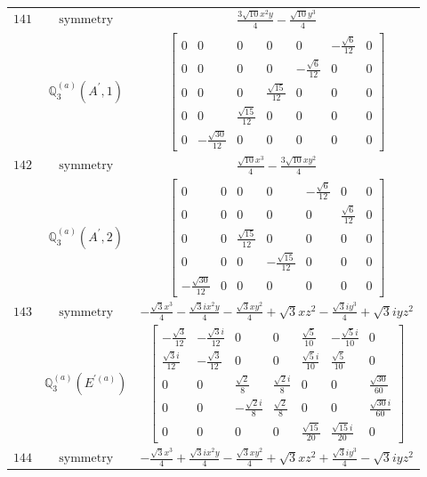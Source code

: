 \documentclass[fleqn,8pt,landscape]{jsarticle}
\begin{document}
\begin{longtable}{ccc}
$ 141 $ & $ \text{symmetry} $ & $ \frac{3 \sqrt{10} x^{2} y}{4} - \frac{\sqrt{10} y^{3}}{4} $ \\
$  $ & $ \mathbb{Q}_{3}^{(a)}(A^{\prime},1) $ & $ \begin{bmatrix} 0 & 0 & 0 & 0 & 0 & - \frac{\sqrt{6}}{12} & 0 \\ 0 & 0 & 0 & 0 & - \frac{\sqrt{6}}{12} & 0 & 0 \\ 0 & 0 & 0 & \frac{\sqrt{15}}{12} & 0 & 0 & 0 \\ 0 & 0 & \frac{\sqrt{15}}{12} & 0 & 0 & 0 & 0 \\ 0 & - \frac{\sqrt{30}}{12} & 0 & 0 & 0 & 0 & 0 \end{bmatrix} $ \\ \hline
$ 142 $ & $ \text{symmetry} $ & $ \frac{\sqrt{10} x^{3}}{4} - \frac{3 \sqrt{10} x y^{2}}{4} $ \\
$  $ & $ \mathbb{Q}_{3}^{(a)}(A^{\prime},2) $ & $ \begin{bmatrix} 0 & 0 & 0 & 0 & - \frac{\sqrt{6}}{12} & 0 & 0 \\ 0 & 0 & 0 & 0 & 0 & \frac{\sqrt{6}}{12} & 0 \\ 0 & 0 & \frac{\sqrt{15}}{12} & 0 & 0 & 0 & 0 \\ 0 & 0 & 0 & - \frac{\sqrt{15}}{12} & 0 & 0 & 0 \\ - \frac{\sqrt{30}}{12} & 0 & 0 & 0 & 0 & 0 & 0 \end{bmatrix} $ \\ \hline
$ 143 $ & $ \text{symmetry} $ & $ - \frac{\sqrt{3} x^{3}}{4} - \frac{\sqrt{3} i x^{2} y}{4} - \frac{\sqrt{3} x y^{2}}{4} + \sqrt{3} x z^{2} - \frac{\sqrt{3} i y^{3}}{4} + \sqrt{3} i y z^{2} $ \\
$  $ & $ \mathbb{Q}_{3}^{(a)}(E^{\prime(a)}) $ & $ \begin{bmatrix} - \frac{\sqrt{3}}{12} & - \frac{\sqrt{3} i}{12} & 0 & 0 & \frac{\sqrt{5}}{10} & - \frac{\sqrt{5} i}{10} & 0 \\ \frac{\sqrt{3} i}{12} & - \frac{\sqrt{3}}{12} & 0 & 0 & \frac{\sqrt{5} i}{10} & \frac{\sqrt{5}}{10} & 0 \\ 0 & 0 & \frac{\sqrt{2}}{8} & \frac{\sqrt{2} i}{8} & 0 & 0 & \frac{\sqrt{30}}{60} \\ 0 & 0 & - \frac{\sqrt{2} i}{8} & \frac{\sqrt{2}}{8} & 0 & 0 & \frac{\sqrt{30} i}{60} \\ 0 & 0 & 0 & 0 & \frac{\sqrt{15}}{20} & \frac{\sqrt{15} i}{20} & 0 \end{bmatrix} $ \\ \hline
$ 144 $ & $ \text{symmetry} $ & $ - \frac{\sqrt{3} x^{3}}{4} + \frac{\sqrt{3} i x^{2} y}{4} - \frac{\sqrt{3} x y^{2}}{4} + \sqrt{3} x z^{2} + \frac{\sqrt{3} i y^{3}}{4} - \sqrt{3} i y z^{2} $ \\

\end{longtable}
\end{document}
